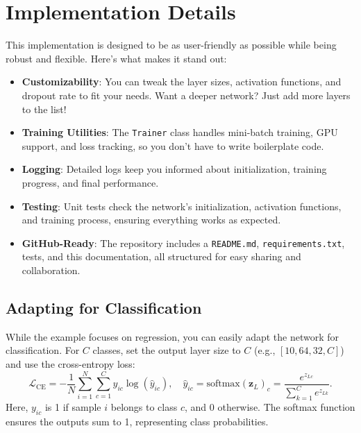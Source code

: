 \documentclass[11pt, a4paper]{article}
\begin{document}
\section{Implementation Details}
This implementation is designed to be as user-friendly as possible while being robust and flexible. Here’s what makes it stand out:
\begin{itemize}
    \item \textbf{Customizability}: You can tweak the layer sizes, activation functions, and dropout rate to fit your needs. Want a deeper network? Just add more layers to the list!
    \item \textbf{Training Utilities}: The \texttt{Trainer} class handles mini-batch training, GPU support, and loss tracking, so you don’t have to write boilerplate code.
    \item \textbf{Logging}: Detailed logs keep you informed about initialization, training progress, and final performance.
    \item \textbf{Testing}: Unit tests check the network’s initialization, activation functions, and training process, ensuring everything works as expected.
    \item \textbf{GitHub-Ready}: The repository includes a \texttt{README.md}, \texttt{requirements.txt}, tests, and this documentation, all structured for easy sharing and collaboration.
\end{itemize}

\subsection{Adapting for Classification}
While the example focuses on regression, you can easily adapt the network for classification. For $C$ classes, set the output layer size to $C$ (e.g., $[10, 64, 32, C]$) and use the cross-entropy loss:
\begin{equation}
    \mathcal{L}_{\text{CE}} = -\frac{1}{N} \sum_{i=1}^N \sum_{c=1}^C y_{ic} \log(\hat{y}_{ic}), \quad \hat{y}_{ic} = \text{softmax}(\mathbf{z}_L)_c = \frac{e^{z_{Lc}}}{\sum_{k=1}^C e^{z_{Lk}}}. \label{eq:cross_entropy}
\end{equation}
Here, $y_{ic}$ is 1 if sample $i$ belongs to class $c$, and 0 otherwise. The softmax function ensures the outputs sum to 1, representing class probabilities.
\end{document}

